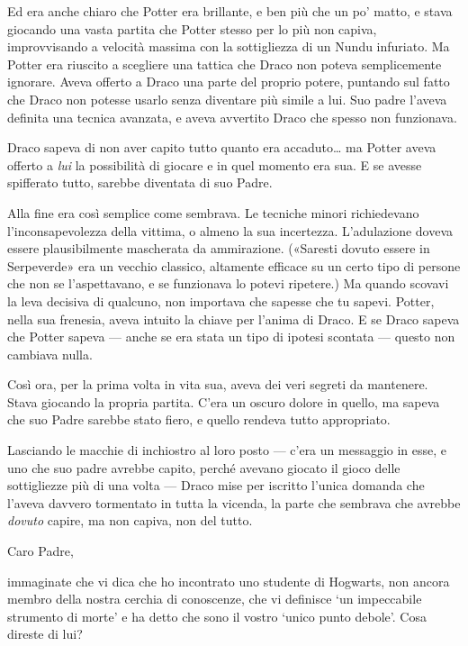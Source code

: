 Ed era anche chiaro che Potter era brillante, e ben più che un po’ matto, e stava giocando una vasta partita che Potter stesso per lo più non capiva, improvvisando a velocità massima con la sottigliezza di un Nundu infuriato. Ma Potter era riuscito a scegliere una tattica che Draco non poteva semplicemente ignorare. Aveva offerto a Draco una parte del proprio potere, puntando sul fatto che Draco non potesse usarlo senza diventare più simile a lui. Suo padre l’aveva definita una tecnica avanzata, e aveva avvertito Draco che spesso non funzionava.

Draco sapeva di non aver capito tutto quanto era accaduto… ma Potter aveva offerto a \textit{lui} la possibilità di giocare e in quel momento era sua. E se avesse spifferato tutto, sarebbe diventata di suo Padre.

Alla fine era così semplice come sembrava. Le tecniche minori richiedevano l’inconsapevolezza della vittima, o almeno la sua incertezza. L’adulazione doveva essere plausibilmente mascherata da ammirazione. («Saresti dovuto essere in Serpeverde» era un vecchio classico, altamente efficace su un certo tipo di persone che non se l’aspettavano, e se funzionava lo potevi ripetere.) Ma quando scovavi la leva decisiva di qualcuno, non importava che sapesse che tu sapevi. Potter, nella sua frenesia, aveva intuito la chiave per l’anima di Draco. E se Draco sapeva che Potter sapeva — anche se era stata un tipo di ipotesi scontata — questo non cambiava nulla.

Così ora, per la prima volta in vita sua, aveva dei veri segreti da mantenere. Stava giocando la propria partita. C’era un oscuro dolore in quello, ma sapeva che suo Padre sarebbe stato fiero, e quello rendeva tutto appropriato.

Lasciando le macchie di inchiostro al loro posto — c’era un messaggio in esse, e uno che suo padre avrebbe capito, perché avevano giocato il gioco delle sottigliezze più di una volta — Draco mise per iscritto l’unica domanda che l’aveva davvero tormentato in tutta la vicenda, la parte che sembrava che avrebbe \textit{dovuto} capire, ma non capiva, non del tutto.

\vspace{1em}
\begin{addmargin}[3em]{3em}%
\begin{itpars}
Caro Padre,

immaginate che vi dica che ho incontrato uno studente di Hogwarts, non ancora membro della nostra cerchia di conoscenze, che vi definisce ‘un impeccabile strumento di morte’ e ha detto che sono il vostro ‘unico punto debole’. Cosa direste di lui?
\end{itpars}
\end{addmargin}
\vspace{1em}


